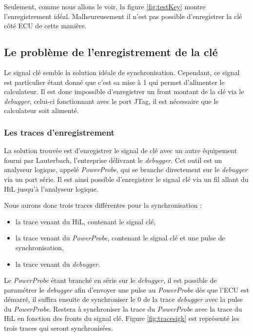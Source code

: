Seulement, comme nous allons le voir, la figure \ref{fig:testKey} montre l'enregistrement idéal. Malheureusement il n'est pas possible d'enregistrer la clé côté ECU de cette manière.

\subsection{Le problème de l'enregistrement de la clé}
Le signal clé semble la solution idéale de synchronisation. Cependant, ce signal est particulier étant donné que c'est sa mise à 1 qui permet d'alimenter le calculateur. Il est donc impossible d'enregistrer un front montant de la clé via le \textit{debugger}, celui-ci fonctionnant avec le port JTag, il est nécessaire que le calculateur soit alimenté. 

\subsubsection{Les traces d'enregistrement}\label{tracesSync}
La solution trouvée est d'enregistrer le signal de clé avec un autre équipement fourni par Lauterbach, l'entreprise délivrant le \textit{debugger}. Cet outil est un analyseur logique, appelé \textit{PowerProbe}, qui se branche directement sur le \textit{debugger} via un port série. Il est ainsi possible d'enregistrer le signal clé via un fil allant du HiL jusqu'à l'analyseur logique.

Nous aurons donc trois traces différentes pour la synchronisation : 
\begin{itemize}
	\item la trace venant du HiL, contenant le signal clé,
	\item la trace venant du \textit{PowerProbe}, contenant le signal clé et une pulse de synchronisation,
	\item la trace venant du \textit{debugger}.
\end{itemize}

Le \textit{PowerProbe} étant branché en série sur le \textit{debugger}, il est possible de paramétrer le \textit{debugger} afin d'envoyer une pulse au \textit{PowerProbe} dès que l'ECU est démarré, il suffira ensuite de synchroniser le 0 de la trace \textit{debugger} avec la pulse du \textit{PowerProbe}. Restera à synchroniser la trace du \textit{PowerProbe} avec la trace du HiL en fonction des fronts du signal clé. Figure \ref{fig:tracesigk} est représenté les trois traces qui seront synchronisées. 

